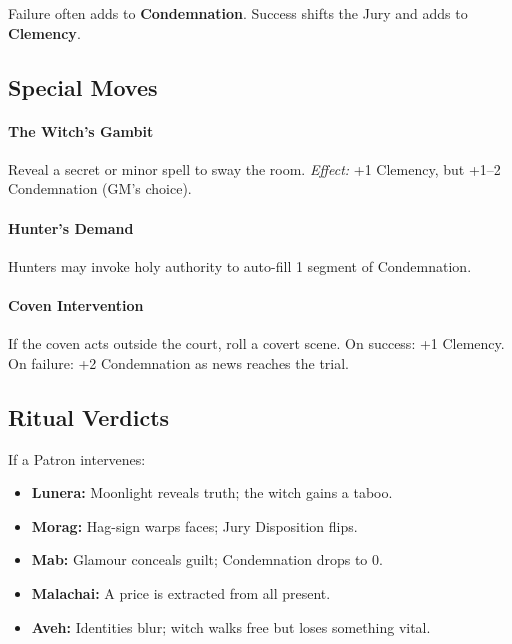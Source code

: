 \documentclass[11pt]{book}
\begin{document}
Failure often adds to \textbf{Condemnation}.  
Success shifts the Jury and adds to \textbf{Clemency}.


\subsection*{Special Moves}

\paragraph{The Witch's Gambit}  
Reveal a secret or minor spell to sway the room.  
\emph{Effect:} +1 Clemency, but +1--2 Condemnation (GM's choice).

\paragraph{Hunter's Demand}  
Hunters may invoke holy authority to auto-fill 1 segment of Condemnation.

\paragraph{Coven Intervention}  
If the coven acts outside the court, roll a covert scene.  
On success: +1 Clemency.  
On failure: +2 Condemnation as news reaches the trial.


\subsection*{Ritual Verdicts}
If a Patron intervenes:

\begin{itemize}[leftmargin=1.5em]
    \item \textbf{Lunera:} Moonlight reveals truth; the witch gains a taboo.  
    \item \textbf{Morag:} Hag-sign warps faces; Jury Disposition flips.  
    \item \textbf{Mab:} Glamour conceals guilt; Condemnation drops to 0.  
    \item \textbf{Malachai:} A price is extracted from all present.  
    \item \textbf{Aveh:} Identities blur; witch walks free but loses something vital.
\end{itemize}
\end{document}
